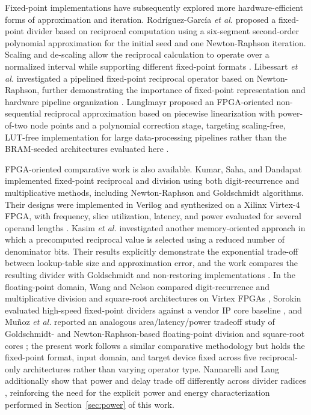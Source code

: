 \documentclass[manuscript,screen,review]{acmart}
\begin{document}
Fixed-point implementations have subsequently explored more hardware-efficient forms of approximation and iteration. Rodr\'{i}guez-Garc\'{i}a \textit{et al.} proposed a fixed-point divider based on reciprocal computation using a six-segment second-order polynomial approximation for the initial seed and one Newton-Raphson iteration. Scaling and de-scaling allow the reciprocal calculation to operate over a normalized interval while supporting different fixed-point formats \cite{Rodriguez13}. Libessart \textit{et al.} investigated a pipelined fixed-point reciprocal operator based on Newton-Raphson, further demonstrating the importance of fixed-point representation and hardware pipeline organization \cite{Libessart17}. Lunglmayr proposed an FPGA-oriented non-sequential reciprocal approximation based on piecewise linearization with power-of-two node points and a polynomial correction stage, targeting scaling-free, LUT-free implementation for large data-processing pipelines rather than the BRAM-seeded architectures evaluated here \cite{Lunglmayr21}.

FPGA-oriented comparative work is also available. Kumar, Saha, and Dandapat implemented fixed-point reciprocal and division using both digit-recurrence and multiplicative methods, including Newton-Raphson and Goldschmidt algorithms. Their designs were implemented in Verilog and synthesized on a Xilinx Virtex-4 FPGA, with frequency, slice utilization, latency, and power evaluated for several operand lengths \cite{Kumar17}. Kasim \textit{et al.} investigated another memory-oriented approach in which a precomputed reciprocal value is selected using a reduced number of denominator bits. Their results explicitly demonstrate the exponential trade-off between lookup-table size and approximation error, and the work compares the resulting divider with Goldschmidt and non-restoring implementations \cite{Kasim13}. In the floating-point domain, Wang and Nelson compared digit-recurrence and multiplicative division and square-root architectures on Virtex FPGAs \cite{WangNelson03}, Sorokin evaluated high-speed fixed-point dividers against a vendor IP core baseline \cite{Sorokin06}, and Mu\~{n}oz \textit{et al.} reported an analogous area/latency/power tradeoff study of Goldschmidt- and Newton-Raphson-based floating-point division and square-root cores \cite{MunozEtAl10}; the present work follows a similar comparative methodology but holds the fixed-point format, input domain, and target device fixed across five reciprocal-only architectures rather than varying operator type. Nannarelli and Lang additionally show that power and delay trade off differently across divider radices \cite{NannarelliLang99}, reinforcing the need for the explicit power and energy characterization performed in Section~\ref{sec:power} of this work.
\end{document}
